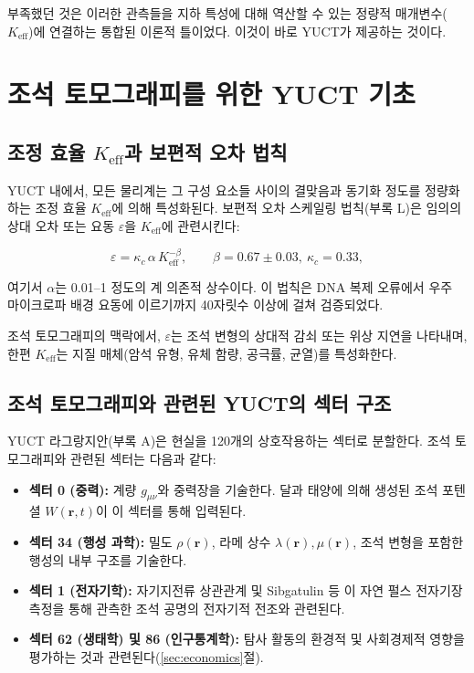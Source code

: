 \documentclass[12pt,a4paper]{article}
\theoremstyle{remark}
\newcommand{\Keff}{K_{\mathrm{eff}}}
\newcommand{\kappac}{\kappa_c}
\newcommand{\eps}{\varepsilon}
\begin{document}
	부족했던 것은 이러한 관측들을 지하 특성에 대해 역산할 수 있는 정량적 매개변수(\(\Keff\))에 연결하는 통합된 이론적 틀이었다. 이것이 바로 YUCT가 제공하는 것이다.
	
	\section{조석 토모그래피를 위한 YUCT 기초}
	\label{sec:yuct-foundations}
	
	\subsection{조정 효율 \(\Keff\)과 보편적 오차 법칙}
	
	YUCT 내에서, 모든 물리계는 그 구성 요소들 사이의 결맞음과 동기화 정도를 정량화하는 조정 효율 \(\Keff\)에 의해 특성화된다. 보편적 오차 스케일링 법칙(부록 L)은 임의의 상대 오차 또는 요동 \(\eps\)을 \(\Keff\)에 관련시킨다:
	
	\begin{equation}
		\eps = \kappac \, \alpha \, \Keff^{-\beta}, \qquad \beta = 0.67 \pm 0.03,\ \kappac = 0.33,
		\label{eq:universal-scaling}
	\end{equation}
	
	여기서 \(\alpha\)는 0.01–1 정도의 계 의존적 상수이다. 이 법칙은 DNA 복제 오류에서 우주 마이크로파 배경 요동에 이르기까지 40자릿수 이상에 걸쳐 검증되었다.
	
	조석 토모그래피의 맥락에서, \(\eps\)는 조석 변형의 상대적 감쇠 또는 위상 지연을 나타내며, 한편 \(\Keff\)는 지질 매체(암석 유형, 유체 함량, 공극률, 균열)를 특성화한다.
	
	\subsection{조석 토모그래피와 관련된 YUCT의 섹터 구조}
	
	YUCT 라그랑지안(부록 A)은 현실을 120개의 상호작용하는 섹터로 분할한다. 조석 토모그래피와 관련된 섹터는 다음과 같다:
	
	\begin{itemize}
		\item \textbf{섹터 0 (중력):} 계량 \(g_{\mu\nu}\)와 중력장을 기술한다. 달과 태양에 의해 생성된 조석 포텐셜 \(W(\mathbf{r},t)\)이 이 섹터를 통해 입력된다.
		\item \textbf{섹터 34 (행성 과학):} 밀도 \(\rho(\mathbf{r})\), 라메 상수 \(\lambda(\mathbf{r}), \mu(\mathbf{r})\), 조석 변형을 포함한 행성의 내부 구조를 기술한다.
		\item \textbf{섹터 1 (전자기학):} 자기지전류 상관관계 및 Sibgatulin 등 \cite{Sibgatulin2014}이 자연 펄스 전자기장 측정을 통해 관측한 조석 공명의 전자기적 전조와 관련된다.
		\item \textbf{섹터 62 (생태학) 및 86 (인구통계학):} 탐사 활동의 환경적 및 사회경제적 영향을 평가하는 것과 관련된다(\ref{sec:economics}절).
	\end{itemize}
	
\end{document}
